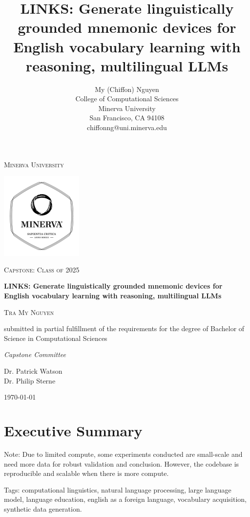 \documentclass[11pt]{article}
\title{\textbf{LINKS}: Generate linguistically grounded mnemonic devices for English vocabulary learning with reasoning, multilingual LLMs
}
\author{%
  My (Chiffon) Nguyen \\
  College of Computational Sciences \\
  Minerva University \\
  San Francisco, CA 94108 \\
  chiffonng@uni.minerva.edu
}
\begin{document}
\begin{titlepage}
\centering
{\scshape\LARGE Minerva University \par}
\vspace{1cm}
\begin{center}
    \includegraphics[width = 0.4\linewidth]{figures/minerva_logo.pdf}
\end{center}
{\scshape\Large Capstone: Class of 2025 \par}
\vspace{1.5cm}
{\huge\bfseries LINKS: Generate linguistically grounded mnemonic devices for English vocabulary learning with reasoning, multilingual LLMs \par}
\vspace{2cm}
{\scshape\large Tra My Nguyen \par}
submitted in partial fulfillment of the requirements for the degree of Bachelor of Science in Computational Sciences \par
\vspace{2cm}
{\large\itshape Capstone Committee \par}
Dr. Patrick Watson \\
Dr. Philip Sterne

\vfill
{\large \today\par}
\end{titlepage}

\onecolumn
\section*{Executive Summary}
Note: Due to limited compute, some experiments conducted are small-scale and need more data for robust validation and conclusion. However, the codebase is reproducible and scalable when there is more compute.

Tags: computational linguistics, natural language processing, large language model, language education, english as a foreign language, vocabulary acquisition, synthetic data generation.
\end{document}
